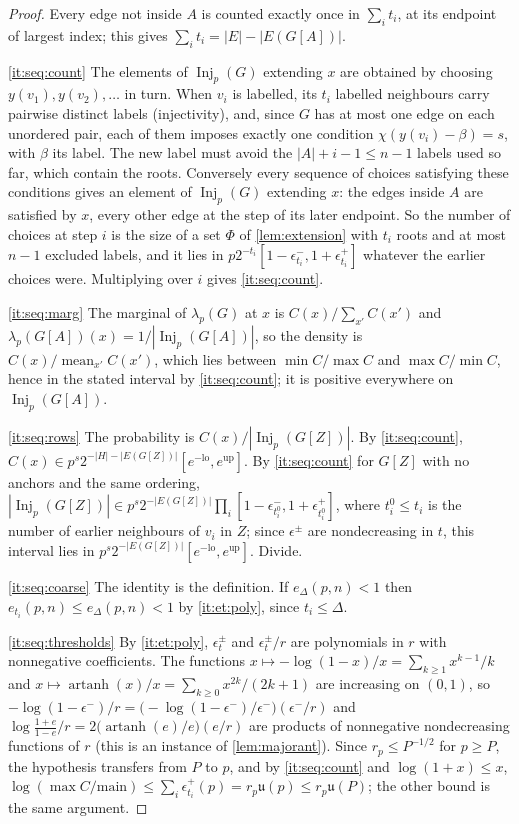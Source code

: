 \begin{proof}
Every edge not inside $A$ is counted exactly once in $\sum_it_i$, at its
endpoint of largest index; this gives $\sum_it_i=|E|-|E(G[A])|$.

\ref{it:seq:count} The elements of $\operatorname{Inj}_p(G)$ extending $x$ are
obtained by choosing $y(v_1),y(v_2),\dots$ in turn. When $v_i$ is labelled,
its $t_i$ labelled neighbours carry pairwise distinct labels (injectivity),
and, since $G$ has at most one edge on each unordered pair, each of them
imposes exactly one condition $\chi(y(v_i)-\beta)=s$, with $\beta$ its label. The
new label must avoid the $|A|+i-1\le n-1$ labels used so far, which contain
the roots. Conversely every sequence of choices satisfying these conditions
gives an element of $\operatorname{Inj}_p(G)$ extending $x$: the edges inside
$A$ are satisfied by $x$, every other edge at the step of its later endpoint.
So the number of choices at step $i$ is the size of a set $\Phi$ of
\cref{lem:extension} with $t_i$ roots and at most $n-1$ excluded labels, and it
lies in $p2^{-t_i}[1-\epsilon^-_{t_i},1+\epsilon^+_{t_i}]$ whatever the earlier
choices were. Multiplying over $i$ gives \ref{it:seq:count}.

\ref{it:seq:marg} The marginal of $\lambda_p(G)$ at $x$ is
$C(x)/\sum_{x'}C(x')$ and $\lambda_p(G[A])(x)=1/|\operatorname{Inj}_p(G[A])|$, so
the density is $C(x)/\operatorname{mean}_{x'}C(x')$, which lies between
$\min C/\max C$ and $\max C/\min C$, hence in the stated interval by
\ref{it:seq:count}; it is positive everywhere on $\operatorname{Inj}_p(G[A])$.

\ref{it:seq:rows} The probability is $C(x)/|\operatorname{Inj}_p(G[Z])|$. By
\ref{it:seq:count}, $C(x)\in p^s2^{-|H|-|E(G[Z])|}[e^{-\mathrm{lo}},e^{\mathrm{up}}]$.
By \ref{it:seq:count} for $G[Z]$ with no anchors and the same ordering,
$|\operatorname{Inj}_p(G[Z])|\in p^s2^{-|E(G[Z])|}\prod_i[1-\epsilon^-_{t^0_i},1+\epsilon^+_{t^0_i}]$,
where $t^0_i\le t_i$ is the number of earlier neighbours of $v_i$ in $Z$; since
$\epsilon^\pm$ are nondecreasing in $t$, this interval lies in
$p^s2^{-|E(G[Z])|}[e^{-\mathrm{lo}},e^{\mathrm{up}}]$. Divide.

\ref{it:seq:coarse} The identity is the definition. If $e_\Delta(p,n)<1$ then
$e_{t_i}(p,n)\le e_\Delta(p,n)<1$ by \ref{it:et:poly}, since $t_i\le\Delta$.

\ref{it:seq:thresholds} By \ref{it:et:poly}, $\epsilon^\pm_t$ and $\epsilon^\pm_t/r$ are
polynomials in $r$ with nonnegative coefficients. The functions
$x\mapsto-\log(1-x)/x=\sum_{k\ge1}x^{k-1}/k$ and
$x\mapsto\operatorname{artanh}(x)/x=\sum_{k\ge0}x^{2k}/(2k+1)$ are increasing
on $(0,1)$, so
$-\log(1-\epsilon^-)/r=\bigl(-\log(1-\epsilon^-)/\epsilon^-\bigr)(\epsilon^-/r)$ and
$\log\frac{1+e}{1-e}/r=2\bigl(\operatorname{artanh}(e)/e\bigr)(e/r)$ are products of
nonnegative nondecreasing functions of $r$ (this is an instance of
\cref{lem:majorant}). Since $r_p\le P^{-1/2}$ for $p\ge P$, the hypothesis
transfers from $P$ to $p$, and by \ref{it:seq:count} and $\log(1+x)\le x$,
$\log(\max C/\mathrm{main})\le\sum_i\epsilon^+_{t_i}(p)=r_p\mathfrak u(p)\le
r_p\mathfrak u(P)$; the other bound is the same argument.
\end{proof}

